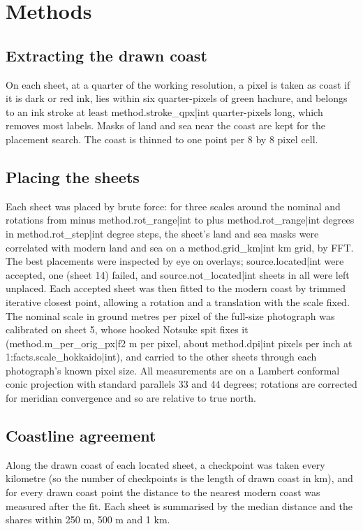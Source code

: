 \documentclass[11pt,a4paper]{article}
\begin{document}
\section{Methods}
\subsection{Extracting the drawn coast}
On each sheet, at a quarter of the working resolution, a pixel is taken as coast if it is dark or red ink, lies within six quarter-pixels of green hachure, and belongs to an ink stroke at least {{method.stroke_qpx|int}} quarter-pixels long, which removes most labels. Masks of land and sea near the coast are kept for the placement search. The coast is thinned to one point per 8 by 8 pixel cell.

\subsection{Placing the sheets}
Each sheet was placed by brute force: for three scales around the nominal and rotations from minus {{method.rot_range|int}} to plus {{method.rot_range|int}} degrees in {{method.rot_step|int}} degree steps, the sheet's land and sea masks were correlated with modern land and sea on a {{method.grid_km|int}} km grid, by FFT. The best placements were inspected by eye on overlays; {{source.located|int}} were accepted, one (sheet 14) failed, and {{source.not_located|int}} sheets in all were left unplaced. Each accepted sheet was then fitted to the modern coast by trimmed iterative closest point, allowing a rotation and a translation with the scale fixed. The nominal scale in ground metres per pixel of the full-size photograph was calibrated on sheet 5, whose hooked Notsuke spit fixes it ({{method.m_per_orig_px|f2}} m per pixel, about {{method.dpi|int}} pixels per inch at 1:{{facts.scale_hokkaido|int}}), and carried to the other sheets through each photograph's known pixel size. All measurements are on a Lambert conformal conic projection with standard parallels 33 and 44 degrees; rotations are corrected for meridian convergence and so are relative to true north.

\subsection{Coastline agreement}
Along the drawn coast of each located sheet, a checkpoint was taken every kilometre (so the number of checkpoints is the length of drawn coast in km), and for every drawn coast point the distance to the nearest modern coast was measured after the fit. Each sheet is summarised by the median distance and the shares within 250 m, 500 m and 1 km.
\end{document}
